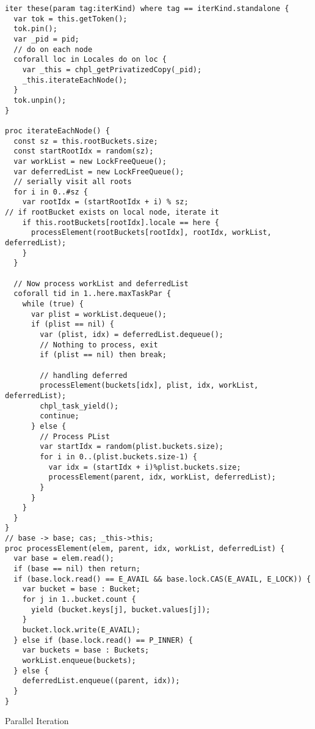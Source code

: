 \documentclass[letterpaper, 10 pt, conference]{ieeeconf}  %
\begin{document}
\begin{listing}
\begin{verbatim}
iter these(param tag:iterKind) where tag == iterKind.standalone {
  var tok = this.getToken();
  tok.pin();
  var _pid = pid;
  // do on each node
  coforall loc in Locales do on loc {
    var _this = chpl_getPrivatizedCopy(_pid);
    _this.iterateEachNode();
  }
  tok.unpin();
}

proc iterateEachNode() {
  const sz = this.rootBuckets.size;
  const startRootIdx = random(sz);
  var workList = new LockFreeQueue();
  var deferredList = new LockFreeQueue();
  // serially visit all roots
  for i in 0..#sz {
    var rootIdx = (startRootIdx + i) % sz;
// if rootBucket exists on local node, iterate it
    if this.rootBuckets[rootIdx].locale == here {
      processElement(rootBuckets[rootIdx], rootIdx, workList, deferredList);
    }
  }

  // Now process workList and deferredList
  coforall tid in 1..here.maxTaskPar {
    while (true) {
      var plist = workList.dequeue();
      if (plist == nil) {
        var (plist, idx) = deferredList.dequeue();
        // Nothing to process, exit
        if (plist == nil) then break;

        // handling deferred
        processElement(buckets[idx], plist, idx, workList, deferredList);
        chpl_task_yield();
        continue;
      } else {
        // Process PList
        var startIdx = random(plist.buckets.size);
        for i in 0..(plist.buckets.size-1) {
          var idx = (startIdx + i)%plist.buckets.size;
          processElement(parent, idx, workList, deferredList);
        }
      }
    }
  }
}
// base -> base; cas; _this->this;
proc processElement(elem, parent, idx, workList, deferredList) {
  var base = elem.read();
  if (base == nil) then return;
  if (base.lock.read() == E_AVAIL && base.lock.CAS(E_AVAIL, E_LOCK)) {
    var bucket = base : Bucket;
    for j in 1..bucket.count {
      yield (bucket.keys[j], bucket.values[j]);
    }
    bucket.lock.write(E_AVAIL);
  } else if (base.lock.read() == P_INNER) {
    var buckets = base : Buckets;
    workList.enqueue(buckets);
  } else {
    deferredList.enqueue((parent, idx));
  }
}
\end{verbatim}
\caption{Parallel Iteration}
\label{lst:paralleliter}
\end{listing}

\end{document}
